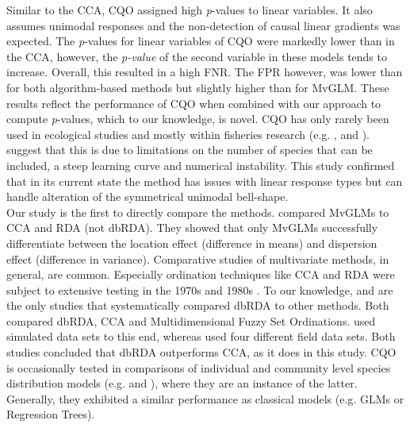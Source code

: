 \documentclass[a4paper,11pt]{article}
\begin{document}

	Similar to the CCA, CQO assigned high \textit{p}-values to linear variables. 
    It also assumes unimodal responses and the non-detection of causal linear gradients was expected. 
    The \textit{p}-values for linear variables of CQO were markedly lower than in the CCA, however, the \textit{p-value} of the second variable in these models tends to increase. 
    Overall, this resulted in a high FNR.
	The FPR however, was lower than for both algorithm-based methods but slightly higher than for MvGLM. 
	These results reflect the performance of CQO when combined with our approach to compute \textit{p}-values, which to our knowledge, is novel. 
CQO has only rarely been used in ecological studies and mostly within fisheries research (e.g. \citet{Vilizzi2012}, \citet{Top2016} and \citet{Carosi2017}). 
	\citet{TerBraak2015} suggest that this is due to limitations on the number of species that can be included, a steep learning curve and numerical instability. 
	This study confirmed that in its current state the method has issues with linear response types but can handle alteration of the symmetrical unimodal bell-shape. \\

 
 	Our study is the first to directly compare the methods. 
 \citet{Warton2012} compared MvGLMs to CCA and RDA (not dbRDA).
 	They showed that only MvGLMs successfully differentiate between the location effect (difference in means) and dispersion effect (difference in variance). 
 	Comparative studies of multivariate methods, in general, are common. 
 	Especially ordination techniques like CCA and RDA were subject to extensive testing in the 1970s and 1980s \citep[e.g.][]{GauchJr.1972, GauchJr1977, Kenkel1986}. 
 	To our knowledge, \citet{Roberts2008} and \citet{Roberts2009} are the only studies that systematically compared dbRDA to other methods. 
 	Both compared dbRDA, CCA and Multidimensional Fuzzy Set Ordinations. 
 	\citet{Roberts2008} used simulated data sets to this end, whereas \citet{Roberts2009} used four different field data sets. 
 	Both studies concluded that dbRDA outperforms CCA, as it does in this study.
 	CQO is occasionally tested in comparisons of individual and community level species distribution models (e.g. \citet{Baselga2009} and \citet{Maguire2016}),
 	where they are an instance of the latter.
 	Generally, they exhibited a similar performance as classical models (e.g. GLMs or Regression Trees). \\
\end{document}
